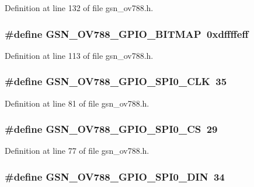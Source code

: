 Definition at line 132 of file gsn\_\-ov788.h.

\hypertarget{a00537_a6410c456ee5a94f559cc29a19593c562}{
\subsubsection[{GSN\_\-OV788\_\-GPIO\_\-BITMAP}]{\setlength{\rightskip}{0pt plus 5cm}\#define GSN\_\-OV788\_\-GPIO\_\-BITMAP~0xdffffeff}}
\label{a00537_a6410c456ee5a94f559cc29a19593c562}


Definition at line 113 of file gsn\_\-ov788.h.

\hypertarget{a00537_a585ac48a0172ee6b25f0f9795c2fea76}{
\subsubsection[{GSN\_\-OV788\_\-GPIO\_\-SPI0\_\-CLK}]{\setlength{\rightskip}{0pt plus 5cm}\#define GSN\_\-OV788\_\-GPIO\_\-SPI0\_\-CLK~35}}
\label{a00537_a585ac48a0172ee6b25f0f9795c2fea76}


Definition at line 81 of file gsn\_\-ov788.h.

\hypertarget{a00537_a01e018e4c5178685fbc46c045ac5d00a}{
\subsubsection[{GSN\_\-OV788\_\-GPIO\_\-SPI0\_\-CS}]{\setlength{\rightskip}{0pt plus 5cm}\#define GSN\_\-OV788\_\-GPIO\_\-SPI0\_\-CS~29}}
\label{a00537_a01e018e4c5178685fbc46c045ac5d00a}


Definition at line 77 of file gsn\_\-ov788.h.

\hypertarget{a00537_aba66b4f5e20b47e226bff2aac9976fed}{
\subsubsection[{GSN\_\-OV788\_\-GPIO\_\-SPI0\_\-DIN}]{\setlength{\rightskip}{0pt plus 5cm}\#define GSN\_\-OV788\_\-GPIO\_\-SPI0\_\-DIN~34}}
\label{a00537_aba66b4f5e20b47e226bff2aac9976fed}


